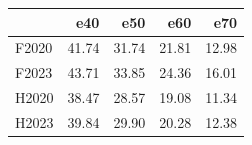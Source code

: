 \begin{tabular}{lrrrr}
\toprule
 & e40 & e50 & e60 & e70 \\
\midrule
F2020 & 41.74 & 31.74 & 21.81 & 12.98 \\
F2023 & 43.71 & 33.85 & 24.36 & 16.01 \\
H2020 & 38.47 & 28.57 & 19.08 & 11.34 \\
H2023 & 39.84 & 29.90 & 20.28 & 12.38 \\
\bottomrule
\end{tabular}
